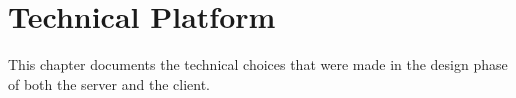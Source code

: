 \chapter{Technical Platform}\label{cha:technicalPlatform}

This chapter documents the technical choices that were made in the design phase of both the server and the client. 	







